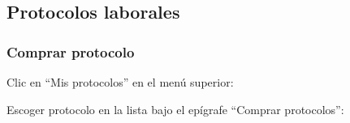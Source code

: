 \documentclass[12pt, spanish]{article}
\begin{document}

    \subsection{Protocolos laborales}


    \subsubsection{Comprar protocolo}

    \label{sec:buy-protocol}

    \begin{steps}

        \item Clic en ``Mis protocolos'' en el menú superior:

            \medskip
            \begin{minipage}[t]{\linewidth}
            \raggedright
        \end{minipage}

        \item Escoger protocolo en la lista bajo el epígrafe ``Comprar protocolos'':


\end{steps}
\end{document}
